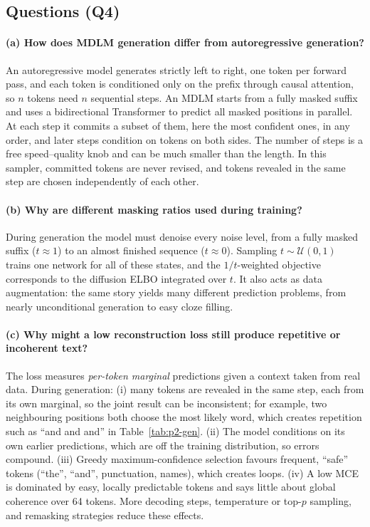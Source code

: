 \documentclass[11pt,a4paper]{article}
\begin{document}

\subsection{Questions (Q4)}

\paragraph{(a) How does MDLM generation differ from autoregressive
generation?}
An autoregressive model generates strictly left to right, one token per
forward pass, and each token is conditioned only on the prefix through
causal attention, so $n$ tokens need $n$ sequential steps. An MDLM
starts from a fully masked suffix and uses a bidirectional Transformer
to predict all masked positions in parallel. At each step it commits a
subset of them, here the most confident ones, in any order, and later
steps condition on tokens on both sides. The number of steps is a free
speed--quality knob and can be much smaller than the length. In this
sampler, committed tokens are never revised, and tokens revealed in the
same step are chosen independently of each other.

\paragraph{(b) Why are different masking ratios used during training?}
During generation the model must denoise every noise level, from a fully
masked suffix ($t\approx1$) to an almost finished sequence
($t\approx0$). Sampling $t\sim\mathcal{U}(0,1)$ trains one network for
all of these states, and the $1/t$-weighted objective corresponds to the
diffusion ELBO integrated over $t$. It also acts as data augmentation:
the same story yields many different prediction problems, from nearly
unconditional generation to easy cloze filling.

\paragraph{(c) Why might a low reconstruction loss still produce
repetitive or incoherent text?}
The loss measures \emph{per-token marginal} predictions given a context
taken from real data. During generation: (i) many tokens are revealed in
the same step, each from its own marginal, so the joint result can be
inconsistent; for example, two neighbouring positions both choose the
most likely word, which creates repetition such as ``and and and'' in
Table~\ref{tab:p2-gen}. (ii) The model conditions on its own earlier
predictions, which are off the training distribution, so errors
compound. (iii) Greedy maximum-confidence selection favours frequent,
``safe'' tokens (``the'', ``and'', punctuation, names), which creates
loops. (iv) A low MCE is dominated by easy, locally predictable tokens
and says little about global coherence over 64 tokens. More decoding
steps, temperature or top-$p$ sampling, and remasking strategies reduce
these effects.
\end{document}
